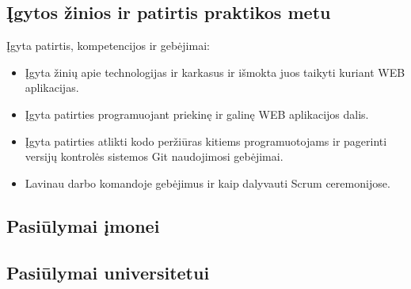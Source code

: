 \documentclass{VUMIFPSPraktika}
\begin{document}
\subsection{Įgytos žinios ir patirtis praktikos metu}
Įgyta patirtis, kompetencijos ir gebėjimai:
\begin{itemize}
    \item Įgyta žinių apie technologijas ir karkasus ir išmokta juos taikyti kuriant WEB aplikacijas.
    \item Įgyta patirties programuojant priekinę ir galinę WEB aplikacijos dalis.
    \item Įgyta patirties atlikti kodo peržiūras kitiems programuotojams ir pagerinti versijų kontrolės sistemos Git naudojimosi gebėjimai.
    \item Lavinau darbo komandoje gebėjimus ir kaip dalyvauti Scrum ceremonijose.
\end{itemize}

\subsection{Pasiūlymai įmonei}
\subsection{Pasiūlymai universitetui}
\end{document}
